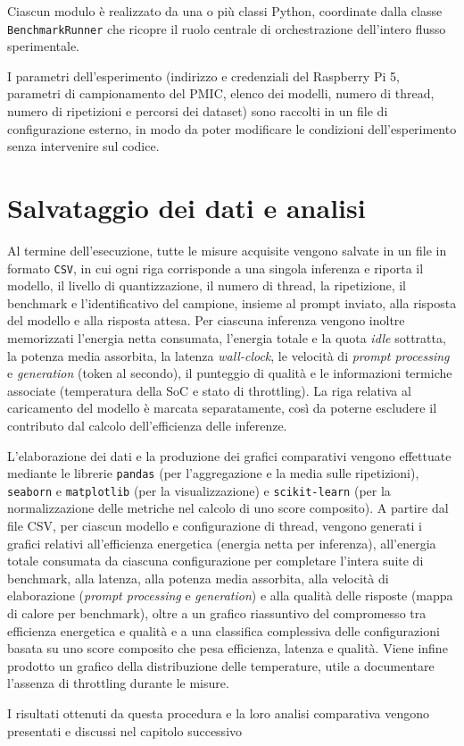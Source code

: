 Ciascun modulo è realizzato da una o più classi Python, coordinate dalla classe
\texttt{BenchmarkRunner} che ricopre il ruolo centrale di orchestrazione
dell'intero flusso sperimentale.

I parametri dell'esperimento (indirizzo e credenziali del Raspberry Pi 5,
parametri di campionamento del PMIC, elenco dei modelli, numero di thread, numero di
ripetizioni e percorsi dei dataset) sono raccolti in un file di configurazione
esterno, in modo da poter modificare le condizioni dell'esperimento senza
intervenire sul codice.

\section{Salvataggio dei dati e analisi}

Al termine dell'esecuzione, tutte le misure acquisite vengono salvate in un file
in formato \texttt{CSV}, in cui ogni riga corrisponde a una singola inferenza e
riporta il modello, il livello di quantizzazione, il numero di thread, la
ripetizione, il benchmark e l'identificativo del campione, insieme al prompt
inviato, alla risposta del modello e alla risposta attesa. Per ciascuna inferenza
vengono inoltre memorizzati l'energia netta consumata, l'energia totale e la quota
\textit{idle} sottratta, la potenza media assorbita, la latenza \textit{wall-clock},
le velocità di \textit{prompt processing} e \textit{generation} (token al secondo),
il punteggio di qualità e le informazioni termiche associate (temperatura della SoC
e stato di throttling). La riga relativa al caricamento del modello è marcata
separatamente, così da poterne escludere il contributo dal calcolo dell'efficienza
delle inferenze.

L'elaborazione dei dati e la produzione dei grafici comparativi vengono effettuate
mediante le librerie \texttt{pandas} (per l'aggregazione e la media sulle
ripetizioni), \texttt{seaborn} e \texttt{matplotlib} (per la visualizzazione) e
\texttt{scikit-learn} (per la normalizzazione delle metriche nel calcolo di uno
score composito). A partire dal file CSV, per ciascun modello e configurazione di
thread, vengono generati i grafici relativi all'efficienza energetica (energia netta
per inferenza), all'energia totale consumata da ciascuna configurazione per
completare l'intera suite di benchmark, alla latenza, alla potenza media assorbita, alla velocità di
elaborazione (\textit{prompt processing} e \textit{generation}) e alla qualità delle
risposte (mappa di calore per benchmark), oltre a un grafico riassuntivo del
compromesso tra efficienza energetica e qualità e a una classifica complessiva delle
configurazioni basata su uno score composito che pesa efficienza, latenza e qualità.
Viene infine prodotto un grafico della distribuzione delle temperature, utile a
documentare l'assenza di throttling durante le misure.

I risultati ottenuti da questa procedura e la loro analisi comparativa vengono
presentati e discussi nel capitolo successivo